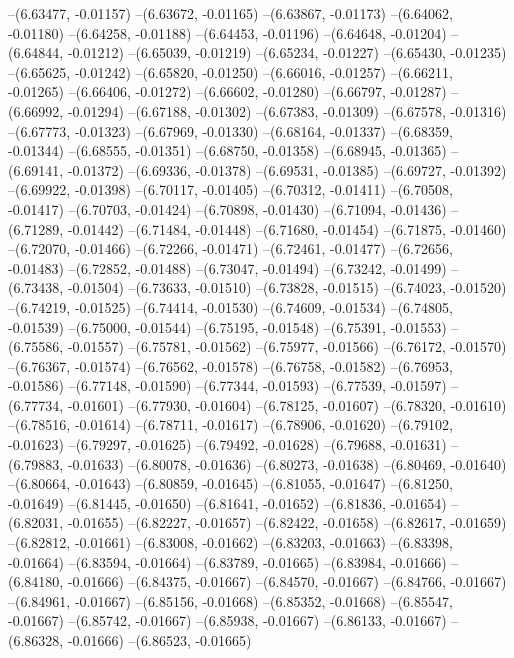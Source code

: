 --(6.63477, -0.01157)
--(6.63672, -0.01165)
--(6.63867, -0.01173)
--(6.64062, -0.01180)
--(6.64258, -0.01188)
--(6.64453, -0.01196)
--(6.64648, -0.01204)
--(6.64844, -0.01212)
--(6.65039, -0.01219)
--(6.65234, -0.01227)
--(6.65430, -0.01235)
--(6.65625, -0.01242)
--(6.65820, -0.01250)
--(6.66016, -0.01257)
--(6.66211, -0.01265)
--(6.66406, -0.01272)
--(6.66602, -0.01280)
--(6.66797, -0.01287)
--(6.66992, -0.01294)
--(6.67188, -0.01302)
--(6.67383, -0.01309)
--(6.67578, -0.01316)
--(6.67773, -0.01323)
--(6.67969, -0.01330)
--(6.68164, -0.01337)
--(6.68359, -0.01344)
--(6.68555, -0.01351)
--(6.68750, -0.01358)
--(6.68945, -0.01365)
--(6.69141, -0.01372)
--(6.69336, -0.01378)
--(6.69531, -0.01385)
--(6.69727, -0.01392)
--(6.69922, -0.01398)
--(6.70117, -0.01405)
--(6.70312, -0.01411)
--(6.70508, -0.01417)
--(6.70703, -0.01424)
--(6.70898, -0.01430)
--(6.71094, -0.01436)
--(6.71289, -0.01442)
--(6.71484, -0.01448)
--(6.71680, -0.01454)
--(6.71875, -0.01460)
--(6.72070, -0.01466)
--(6.72266, -0.01471)
--(6.72461, -0.01477)
--(6.72656, -0.01483)
--(6.72852, -0.01488)
--(6.73047, -0.01494)
--(6.73242, -0.01499)
--(6.73438, -0.01504)
--(6.73633, -0.01510)
--(6.73828, -0.01515)
--(6.74023, -0.01520)
--(6.74219, -0.01525)
--(6.74414, -0.01530)
--(6.74609, -0.01534)
--(6.74805, -0.01539)
--(6.75000, -0.01544)
--(6.75195, -0.01548)
--(6.75391, -0.01553)
--(6.75586, -0.01557)
--(6.75781, -0.01562)
--(6.75977, -0.01566)
--(6.76172, -0.01570)
--(6.76367, -0.01574)
--(6.76562, -0.01578)
--(6.76758, -0.01582)
--(6.76953, -0.01586)
--(6.77148, -0.01590)
--(6.77344, -0.01593)
--(6.77539, -0.01597)
--(6.77734, -0.01601)
--(6.77930, -0.01604)
--(6.78125, -0.01607)
--(6.78320, -0.01610)
--(6.78516, -0.01614)
--(6.78711, -0.01617)
--(6.78906, -0.01620)
--(6.79102, -0.01623)
--(6.79297, -0.01625)
--(6.79492, -0.01628)
--(6.79688, -0.01631)
--(6.79883, -0.01633)
--(6.80078, -0.01636)
--(6.80273, -0.01638)
--(6.80469, -0.01640)
--(6.80664, -0.01643)
--(6.80859, -0.01645)
--(6.81055, -0.01647)
--(6.81250, -0.01649)
--(6.81445, -0.01650)
--(6.81641, -0.01652)
--(6.81836, -0.01654)
--(6.82031, -0.01655)
--(6.82227, -0.01657)
--(6.82422, -0.01658)
--(6.82617, -0.01659)
--(6.82812, -0.01661)
--(6.83008, -0.01662)
--(6.83203, -0.01663)
--(6.83398, -0.01664)
--(6.83594, -0.01664)
--(6.83789, -0.01665)
--(6.83984, -0.01666)
--(6.84180, -0.01666)
--(6.84375, -0.01667)
--(6.84570, -0.01667)
--(6.84766, -0.01667)
--(6.84961, -0.01667)
--(6.85156, -0.01668)
--(6.85352, -0.01668)
--(6.85547, -0.01667)
--(6.85742, -0.01667)
--(6.85938, -0.01667)
--(6.86133, -0.01667)
--(6.86328, -0.01666)
--(6.86523, -0.01665)
